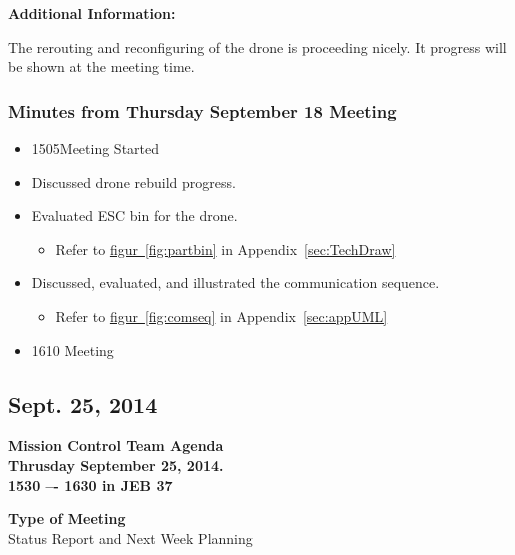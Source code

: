 \documentclass[pdftex,11pt]{article}
\begin{document}
\vspace*{2.5mm}
{ \large \bfseries \noindent Additional Information:}


The rerouting and reconfiguring of the drone is proceeding nicely.  It progress will be shown at the meeting time. 

\subsubsection[short]{Minutes from Thursday September 18 Meeting}

\begin{itemize}
	\item 1505\indent  Meeting Started
	\item Discussed drone rebuild progress.
	\item Evaluated ESC bin for the drone.
	\begin{itemize}
		\item Refer to \hyperref[fig:partbin]{figur~\ref{fig:partbin}} in Appendix~\ref{sec:TechDraw}
	\end{itemize}  
	\item Discussed, evaluated, and illustrated the communication sequence.
	\begin{itemize}
		\item Refer to \hyperref[fig:comseq]{figur~\ref{fig:comseq}} in Appendix~\ref{sec:appUML}
	\end{itemize}
	\item 1610 \indent Meeting 
\end{itemize}


\subsection{Sept. 25, 2014}
{ \huge \bfseries Mission Control Team Agenda \\[0.4cm] }
{ \huge \bfseries Thrusday September 25, 2014.\\1530 –-  1630  in JEB 37\\[0.4cm] }
\vspace*{2.5mm}

{ \large \bfseries \hspace*{2 mm} Type of Meeting\\}
\hspace*{12 mm}  Status Report and  Next Week Planning
\vspace*{1.5mm}
\end{document}

